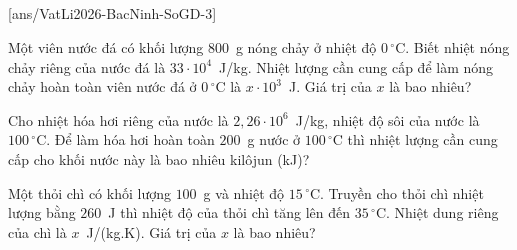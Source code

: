 \begin{ex}
	\end{ex}

	\subsection*{}
	\setcounter{ex}{0}
	[ans/VatLi2026-BacNinh-SoGD-3]

	\begin{ex}%
		Một viên nước đá có khối lượng $800$~g nóng chảy ở nhiệt độ $0\,^\circ\text{C}$. Biết nhiệt nóng chảy riêng của nước đá là $33\cdot 10^4$~J/kg. Nhiệt lượng cần cung cấp để làm nóng chảy hoàn toàn viên nước đá ở $0\,^\circ\text{C}$ là $x\cdot 10^3$~J. Giá trị của $x$ là bao nhiêu?
		\par
	\end{ex}

	\begin{ex}%
		Cho nhiệt hóa hơi riêng của nước là $2{,}26\cdot 10^6$~J/kg, nhiệt độ sôi của nước là $100\,^\circ\text{C}$. Để làm hóa hơi hoàn toàn $200$~g nước ở $100\,^\circ\text{C}$ thì nhiệt lượng cần cung cấp cho khối nước này là bao nhiêu kilôjun (kJ)?
		\par
	\end{ex}

	\begin{ex}%
		Một thỏi chì có khối lượng $100$~g và nhiệt độ $15\,^\circ\text{C}$. Truyền cho thỏi chì nhiệt lượng bằng $260$~J thì nhiệt độ của thỏi chì tăng lên đến $35\,^\circ\text{C}$. Nhiệt dung riêng của chì là $x$~J/(kg.K). Giá trị của $x$ là bao nhiêu?
		\par
	\end{ex}

